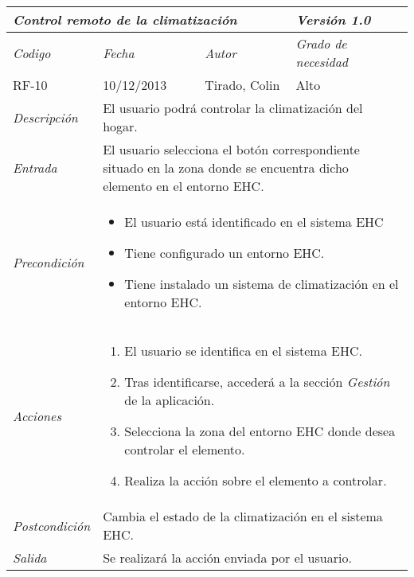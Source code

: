 \begin{tabular}{|p{3cm}|p{4cm}|p{4cm}|p{4cm}|}
\hline \multicolumn{3}{|p{9cm}|}{\textit{Control remoto de la climatizaci\'on}} & \textit{Versi\'on 1.0} \\
\hline \textit{Codigo} & \textit{Fecha} & \textit{Autor} & \textit{Grado de necesidad} \\
RF-10 & 10/12/2013 & Tirado, Colin & Alto \\
\hline \textit{Descripci\'on} & \multicolumn{3}{|p{9cm}|}{El usuario podr\'a controlar la climatizaci\'on del hogar.} \\
\hline \textit{Entrada} & \multicolumn{3}{|p{9cm}|}{El usuario selecciona el bot\'on correspondiente situado en la zona donde se encuentra dicho elemento en el entorno EHC.} \\
\hline \textit{Precondici\'on} & \multicolumn{3}{|p{9cm}|}{
\begin{itemize}
\item El usuario est\'a identificado en el sistema EHC
\item Tiene configurado un entorno EHC.
\item Tiene instalado un sistema de climatizaci\'on en el entorno EHC.
\end{itemize}
} \\
\hline \textit{Acciones} & \multicolumn{3}{|p{9cm}|}{
\begin{enumerate}
\item El usuario se identifica en el sistema EHC.
\item Tras identificarse, acceder\'a a la secci\'on \textit{Gesti\'on} de la aplicaci\'on.
\item Selecciona la zona del entorno EHC donde desea controlar el elemento.
\item Realiza la acci\'on sobre el elemento a controlar.
\end{enumerate}
} \\
\hline \textit{Postcondici\'on} & \multicolumn{3}{|p{9cm}|}{Cambia el estado de la climatizaci\'on en el sistema EHC.} \\
\hline \textit{Salida} & \multicolumn{3}{|p{9cm}|}{Se realizar\'a la acci\'on enviada por el usuario.} \\ \hline
\end{tabular}